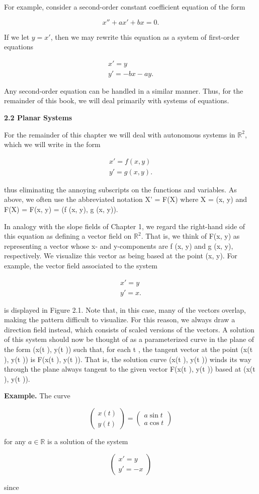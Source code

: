 \documentclass{article}
\begin{document}
For example, consider a second-order constant coefficient equation of the form

\[
x''+ax'+bx=0.
\]

If we let $y = x'$, then we may rewrite this equation as a system of first-order
equations

\[
\begin{matrix}
x' = y \\
y' = -bx - ay.
\end{matrix}
\]

Any second-order equation can be handled in a similar manner. Thus, for the
remainder of this book, we will deal primarily with systems of equations.

\hfill

\textbf{2.2 Planar Systems}

\hfill

For the remainder of this chapter we will deal with autonomous systems in
$\mathbb{R}^2$, which we will write in the form

\[
\begin{matrix}
x' = f(x,y) \\
y' = g(x,y).
\end{matrix}
\]

thus eliminating the annoying subscripts on the functions and variables. As
above, we often use the abbreviated notation X' = F(X) where X = (x, y)
and F(X) = F(x, y) = (f (x, y), g (x, y)).

In analogy with the slope fields of Chapter 1, we regard the right-hand side
of this equation as defining a vector field on $\mathbb{R}^2$. That is, we think of F(x, y)
as representing a vector whose x- and y-components are f (x, y) and g (x, y),
respectively. We visualize this vector as being based at the point (x, y). For
example, the vector field associated to the system

\[
\begin{matrix}
x' = y \\
y' = x.
\end{matrix}
\]

is displayed in Figure 2.1. Note that, in this case, many of the vectors overlap,
making the pattern difficult to visualize. For this reason, we always draw a
direction field instead, which consists of scaled versions of the vectors.
A solution of this system should now be thought of as a parameterized curve
in the plane of the form (x(t ), y(t )) such that, for each t , the tangent vector at
the point (x(t ), y(t )) is F(x(t ), y(t )). That is, the solution curve (x(t ), y(t ))
winds its way through the plane always tangent to the given vector F(x(t ), y(t ))
based at (x(t ), y(t )).

\hfill

\textbf{Example.} The curve

\[
\begin{pmatrix}
x(t) \\
y(t)
\end{pmatrix} = \begin{pmatrix}
a \sin t \\
a \cos t
\end{pmatrix}
\]

for any $a \in \mathbb{R}$ is a solution of the system

\[
\begin{pmatrix}
x' = y \\
y' = -x
\end{pmatrix}
\]

since
\end{document}
